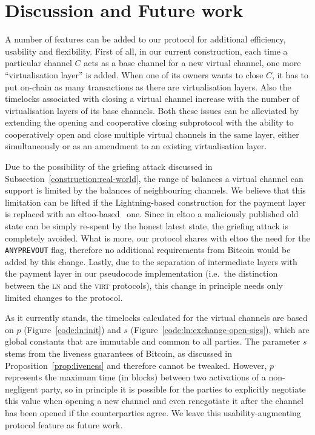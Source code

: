 \section{Discussion and Future work}
  A number of features can be added to our protocol for additional efficiency,
  usability and flexibility. First of all, in our current construction, each
  time a particular channel $C$ acts as a base
  channel for a new virtual channel, one more ``virtualisation layer'' is added. When
  one of its owners wants to close $C$, it has to put on-chain as many
  transactions as there are virtualisation layers. Also the timelocks associated
  with closing a virtual channel increase with the number of virtualisation
  layers of its base channels. Both these issues can be alleviated by extending
  the opening and cooperative closing subprotocol with the ability to
  cooperatively open and close multiple virtual channels in the same layer,
  either simultaneously or as an amendment to an existing virtualisation layer.

  Due to the possibility of the griefing attack discussed in
  Subsection~\ref{construction:real-world}, the range of balances a virtual
  channel can
  support is limited by the balances of neighbouring channels. We believe that
  this limitation can be lifted if the Lightning-based
  construction for the payment layer is replaced with an
  eltoo-based~\cite{eltoo} one. Since in eltoo a maliciously published
  old state can be simply re-spent by the honest latest state, the griefing
  attack is completely avoided. What is more, our protocol shares with eltoo the
  need for the \texttt{ANYPREVOUT} flag, therefore no additional
  requirements from Bitcoin would be added by this change. Lastly,
  due to the separation of intermediate layers with the payment layer in our
  pseudocode implementation (i.e.\ the distinction
  between the \textsc{ln} and the \textsc{virt} protocols), this change
  in principle needs only limited changes to the protocol.

  As it currently stands, the timelocks calculated for the virtual channels are
  based on $p$ (Figure~\ref{code:ln:init}) and $s$
  (Figure~\ref{code:ln:exchange-open-sigs}),
  which are global constants that are immutable and common to all parties. The 
  parameter $s$
  stems from the liveness guarantees of Bitcoin, as discussed in
  Proposition~\ref{prop:liveness} and therefore cannot be tweaked. However, $p$
  represents the maximum time (in blocks) between two activations of a non-negligent party,
  so in principle it is possible for the parties to explicitly negotiate this
  value when opening a new channel and even renegotiate it after the channel has
  been opened if the counterparties agree. We leave this usability-augmenting
  protocol feature as future work.

